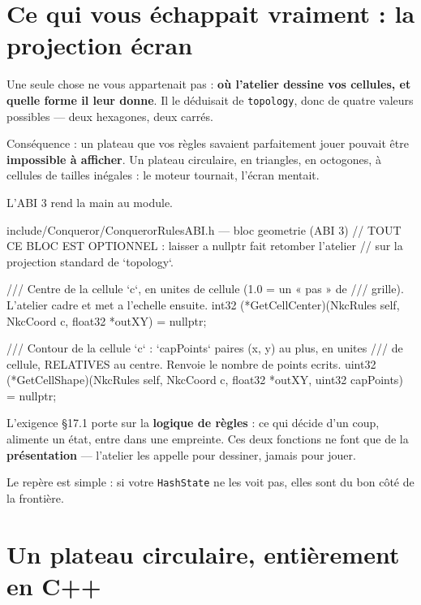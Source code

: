 \section{Ce qui vous échappait vraiment : la projection écran}

Une seule chose ne vous appartenait pas : \textbf{où l'atelier dessine vos
cellules, et quelle forme il leur donne}. Il le déduisait de \texttt{topology},
donc de quatre valeurs possibles — deux hexagones, deux carrés.

Conséquence : un plateau que vos règles savaient parfaitement jouer pouvait être
\textbf{impossible à afficher}. Un plateau circulaire, en triangles, en octogones,
à cellules de tailles inégales : le moteur tournait, l'écran mentait.

L'ABI 3 rend la main au module.

\begin{nkcode}{include/Conqueror/ConquerorRulesABI.h — bloc geometrie (ABI 3)}
// TOUT CE BLOC EST OPTIONNEL : laisser a nullptr fait retomber l'atelier
// sur la projection standard de `topology`.

/// Centre de la cellule `c`, en unites de cellule (1.0 = un « pas » de
/// grille). L'atelier cadre et met a l'echelle ensuite.
int32 (*GetCellCenter)(NkcRules self, NkcCoord c, float32 *outXY) = nullptr;

/// Contour de la cellule `c` : `capPoints` paires (x, y) au plus, en unites
/// de cellule, RELATIVES au centre. Renvoie le nombre de points ecrits.
uint32 (*GetCellShape)(NkcRules self, NkcCoord c, float32 *outXY,
                       uint32 capPoints) = nullptr;
\end{nkcode}

\begin{nkpiege}
L'exigence \S17.1 porte sur la \textbf{logique de règles} : ce qui décide d'un
coup, alimente un état, entre dans une empreinte. Ces deux fonctions ne font que
de la \textbf{présentation} — l'atelier les appelle pour dessiner, jamais pour
jouer.

Le repère est simple : si votre \texttt{HashState} ne les voit pas, elles sont du
bon côté de la frontière.
\end{nkpiege}

\section{Un plateau circulaire, entièrement en C++}

